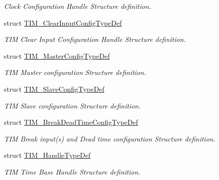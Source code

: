 \begin{DoxyCompactItemize}
\begin{DoxyCompactList}\small\item\em Clock Configuration Handle Structure definition. \end{DoxyCompactList}\item 
struct \mbox{\hyperlink{struct_t_i_m___clear_input_config_type_def}{T\+I\+M\+\_\+\+Clear\+Input\+Config\+Type\+Def}}
\begin{DoxyCompactList}\small\item\em T\+IM Clear Input Configuration Handle Structure definition. \end{DoxyCompactList}\item 
struct \mbox{\hyperlink{struct_t_i_m___master_config_type_def}{T\+I\+M\+\_\+\+Master\+Config\+Type\+Def}}
\begin{DoxyCompactList}\small\item\em T\+IM Master configuration Structure definition. \end{DoxyCompactList}\item 
struct \mbox{\hyperlink{struct_t_i_m___slave_config_type_def}{T\+I\+M\+\_\+\+Slave\+Config\+Type\+Def}}
\begin{DoxyCompactList}\small\item\em T\+IM Slave configuration Structure definition. \end{DoxyCompactList}\item 
struct \mbox{\hyperlink{struct_t_i_m___break_dead_time_config_type_def}{T\+I\+M\+\_\+\+Break\+Dead\+Time\+Config\+Type\+Def}}
\begin{DoxyCompactList}\small\item\em T\+IM Break input(s) and Dead time configuration Structure definition. \end{DoxyCompactList}\item 
struct \mbox{\hyperlink{struct_t_i_m___handle_type_def}{T\+I\+M\+\_\+\+Handle\+Type\+Def}}
\begin{DoxyCompactList}\small\item\em T\+IM Time Base Handle Structure definition. \end{DoxyCompactList}\end{DoxyCompactItemize}
